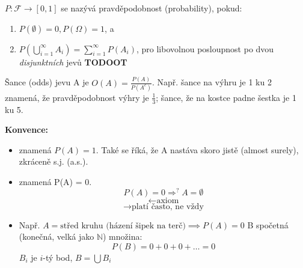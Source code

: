 \documentclass[../main.tex]{subfiles}
\begin{document}
\begin{definition}[Pravděpodobnost]
    $P:\mathcal{F} \rightarrow [0,1]$ se nazývá pravděpodobnost (probability), pokud:
    \begin{enumerate}
        \item $P(\emptyset) = 0, P(\Omega) = 1$, a
        \item $P(\bigcup^\infty_{i=1}A_i) = \sum^\infty_{i=1}P(A_i)$, pro libovolnou posloupnost po dvou \textit{disjunktních} jevů \textbf{TODOOT}
    \end{enumerate}
    Šance (odds) jevu A je $O(A) = \frac{P(A)}{P(A^c)}$. Např. šance na výhru je 1 ku 2 znamená, že
    pravděpodobnost výhry je $\frac{1}{3}$; šance, že na kostce padne šestka je 1 ku 5.
\end{definition}

\noindent
\textbf{Konvence:}
\begin{itemize}
    \item
     znamená $P(A) = 1.$ Také se říká, že A nastáva skoro jistě (almost surely), zkráceně s.j. (a.s.).

    \item
     znamená P(A) = 0.
    \[P(A) = 0 \Rightarrow^? A = \emptyset\]
    \[\leftarrow \text{axiom}\]
    \[\rightarrow \text{platí často, ne vždy}\]

    \item
    Např. $A = {\text{střed kruhu (házení šipek na terč})} \implies P(A) = 0$
    B spočetná (konečná, velká jako $\mathbb{N}$) množina:
    \[P(B) = 0+0+0+\dots=0\]
    $B_i$ je $i$-tý bod,
    $B = \bigcup B_i$
\end{itemize}
\end{document}
